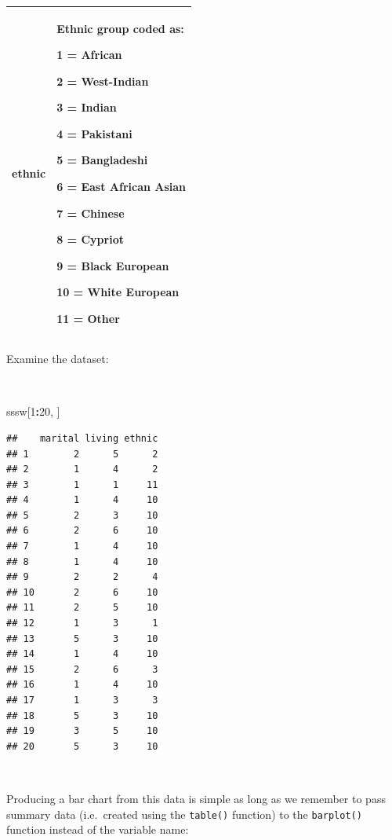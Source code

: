 \documentclass[12pt,a4paper]{book}
\newenvironment{Shaded}{\begin{snugshade}}{\end{snugshade}}
\newcommand{\DecValTok}[1]{\textcolor[rgb]{0.00,0.00,0.81}{#1}}
\newcommand{\NormalTok}[1]{#1}
\newcommand{\OperatorTok}[1]{\textcolor[rgb]{0.81,0.36,0.00}{\textbf{#1}}}
\theoremstyle{definition}
\theoremstyle{definition}
\theoremstyle{definition}
\theoremstyle{remark}
\begin{document}
\begin{longtable}[]{@{}ll@{}}
\toprule
\endhead
\begin{minipage}[t]{0.21\columnwidth}\raggedright
\textbf{ethnic}\strut
\end{minipage} & \begin{minipage}[t]{0.54\columnwidth}\raggedright
Ethnic group coded as:

1 = African

2 = West-Indian

3 = Indian

4 = Pakistani

5 = Bangladeshi

6 = East African Asian

7 = Chinese

8 = Cypriot

9 = Black European

10 = White European

11 = Other\strut
\end{minipage}\tabularnewline
\bottomrule
\end{longtable}

\newpage

Examine the dataset:

~

\begin{Shaded}
\begin{Highlighting}[]
\NormalTok{sssw[}\DecValTok{1}\OperatorTok{:}\DecValTok{20}\NormalTok{, ]}
\end{Highlighting}
\end{Shaded}

\begin{verbatim}
##    marital living ethnic
## 1        2      5      2
## 2        1      4      2
## 3        1      1     11
## 4        1      4     10
## 5        2      3     10
## 6        2      6     10
## 7        1      4     10
## 8        1      4     10
## 9        2      2      4
## 10       2      6     10
## 11       2      5     10
## 12       1      3      1
## 13       5      3     10
## 14       1      4     10
## 15       2      6      3
## 16       1      4     10
## 17       1      3      3
## 18       5      3     10
## 19       3      5     10
## 20       5      3     10
\end{verbatim}

~

Producing a bar chart from this data is simple as long as we remember to
pass summary data (i.e.~created using the \texttt{table()} function) to
the \texttt{barplot()} function instead of the variable name:
\end{document}
